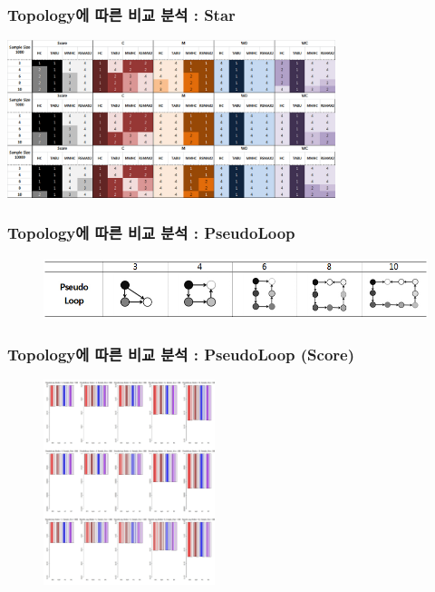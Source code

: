 \documentclass{beamer}
\begin{document}
\begin{frame}
\frametitle{Topology에 따른 비교 분석 : Star}
{\scriptsize{}
	\begin{center}
		\includegraphics[height=130pt]{images/Result_Star}
	\end{center}
}
\end{frame}



\begin{frame}
\frametitle{Topology에 따른 비교 분석 : PseudoLoop}
{\scriptsize{}
	\begin{figure}
		\includegraphics[height=50pt]{images/Topologies_PseudoLoop}
	\end{figure}	
}
\end{frame}



\begin{frame}
\frametitle{Topology에 따른 비교 분석 : PseudoLoop (Score)}
{\scriptsize{}
	\begin{figure}
		\includegraphics[height=170pt]{images/04_PseudoLoop_Score}
	\end{figure}	
}
\end{frame}
\end{document}
